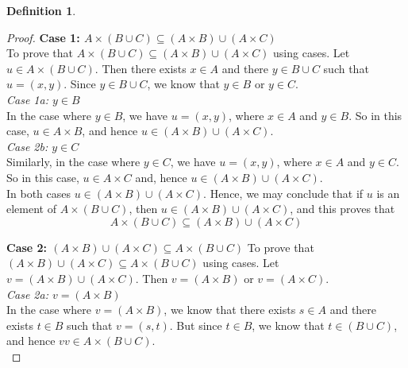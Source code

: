 \documentclass{book}
\theoremstyle{definition}
\newtheorem{definition}{Definition}[section]
\theoremstyle{remark}
\begin{document}
\begin{definition}
\begin{proof}
            \textbf{Case 1: $A \times (B \cup C) \subseteq (A \times B) \cup (A \times C)$} \\
            
                To prove that $A \times (B \cup C) \subseteq (A \times B) \cup (A \times C)$ using  cases. Let $u \in A \times (B \cup C)$. Then there exists $x \in A$ and there $y \in B \cup C$ such that $u = (x,y)$. Since $y \in B \cup C$, we know that $y \in B$ or $y \in C$. \\
                
                
                    \textit{Case 1a: $y \in B$} \\
                        In the case where $y \in B$, we have $u = (x,y)$, where $x \in A$ and $y \in B$. So in this case, $u \in A \times B$, and hence $u \in (A \times B) \cup (A \times C)$. \\
                
                    \textit{Case 2b: $y \in C$} \\
                        Similarly, in the case where $y \in C$, we have $u = (x,y)$, where $x \in A$ and $y \in C$. So in this case, $u \in A \times C$ and, hence $u \in (A \times B) \cup (A \times C)$. \\
                
                In both cases $u \in (A \times B) \cup (A \times C)$. Hence, we may conclude that if $u$ is an element of $A \times (B \cup C)$, then $u \in (A \times B) \cup (A \times C)$, and this proves that 
                    \begin{equation}
                    \label{dfp3}
                        A \times (B \cup C) \subseteq (A \times B) \cup (A \times C)
                    \end{equation}

            \textbf{Case 2: $(A \times B) \cup (A \times C) \subseteq A \times (B \cup C)$}            
                To prove that $(A \times B) \cup (A \times C) \subseteq A \times (B \cup C)$ using cases. Let $v = (A \times B) \cup (A \times C)$. Then $v = (A \times B)$ or $v = (A \times C)$. \\
                
                    \textit{Case 2a: $v = (A \times B)$} \\
                        In the case where $v = (A \times B)$, we know that there exists $s \in A$ and there  exists $t \in B$ such that $v = (s,t)$. But since $t \in B$, we know that $t \in (B \cup C)$, and hence $vv \in A \times (B \cup C)$. \\
                        

\end{proof}
\end{definition}
\end{document}

